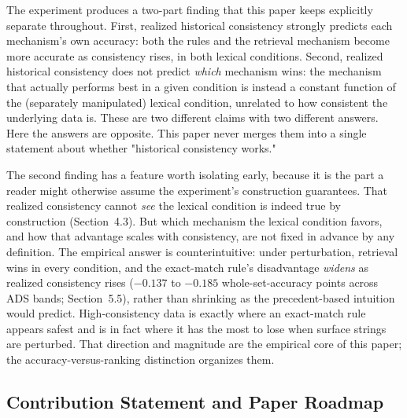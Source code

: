 \documentclass[11pt]{article}
\begin{document}
The experiment produces a two-part finding that this paper keeps explicitly
separate throughout. First, realized historical consistency strongly predicts
each mechanism's own accuracy: both the rules and the retrieval mechanism
become more accurate as consistency rises, in both lexical conditions.
Second, realized historical consistency does not predict \emph{which}
mechanism wins: the mechanism that actually performs best in a given
condition is instead a constant function of the (separately manipulated)
lexical condition, unrelated to how consistent the underlying data is. These
are two different claims with two different answers. Here the answers are
opposite. This paper never merges them into a single statement about whether
"historical consistency works."

The second finding has a feature worth isolating early, because it is the
part a reader might otherwise assume the experiment's construction
guarantees. That realized consistency cannot \emph{see} the lexical
condition is indeed true by construction (Section~4.3). But which
mechanism the lexical condition favors, and how that advantage scales with
consistency, are not fixed in advance by any definition. The empirical
answer is counterintuitive: under perturbation, retrieval wins in every
condition, and the exact-match rule's disadvantage \emph{widens} as
realized consistency rises ($-0.137$ to $-0.185$ whole-set-accuracy points
across ADS bands; Section~5.5), rather than shrinking as the
precedent-based intuition would predict. High-consistency data is exactly
where an exact-match rule appears safest and is in fact where it has the
most to lose when surface strings are perturbed. That direction and
magnitude are the empirical core of this paper; the
accuracy-versus-ranking distinction organizes them.

\subsection{Contribution Statement and Paper Roadmap}
\label{sec:contribution-roadmap}
\end{document}

